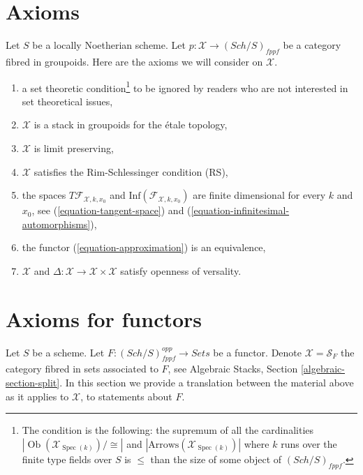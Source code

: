 \documentclass{stacks-project}
\theoremstyle{plain}
\theoremstyle{definition}
\theoremstyle{remark}
\numberwithin{equation}{subsection}
\def\Spec{\mathop{\mathrm{Spec}}}
\def\Sch{\mathit{Sch}}
\def\Ob{\mathop{\mathrm{Ob}}\nolimits}
\begin{document}
\section{Axioms}
\label{section-axioms}

\noindent
Let $S$ be a locally Noetherian scheme. Let
$p : \mathcal{X} \to (\Sch/S)_{fppf}$ be a category fibred in groupoids.
Here are the axioms we will consider on $\mathcal{X}$.
\begin{enumerate}
\item[{[-1]}] a set theoretic condition\footnote{The condition is the
following: the supremum of all the cardinalities
$|\Ob(\mathcal{X}_{\Spec(k)})/\cong|$ and
$|\text{Arrows}(\mathcal{X}_{\Spec(k)})|$ where $k$ runs over the finite
type fields over $S$ is $\leq$ than the size of some
object of $(\Sch/S)_{fppf}$.} to be ignored by
readers who are not interested in set theoretical issues,
\item[{[0]}] $\mathcal{X}$ is a stack in groupoids for the \'etale topology,
\item[{[1]}] $\mathcal{X}$ is limit preserving,
\item[{[2]}] $\mathcal{X}$ satisfies the Rim-Schlessinger condition (RS),
\item[{[3]}] the spaces $T\mathcal{F}_{\mathcal{X}, k, x_0}$ and
$\text{Inf}(\mathcal{F}_{\mathcal{X}, k, x_0})$
are finite dimensional
for every $k$ and $x_0$, see
(\ref{equation-tangent-space}) and
(\ref{equation-infinitesimal-automorphisms}),
\item[{[4]}] the functor (\ref{equation-approximation}) is an equivalence,
\item[{[5]}] $\mathcal{X}$ and
$\Delta : \mathcal{X} \to \mathcal{X} \times \mathcal{X}$ satisfy
openness of versality.
\end{enumerate}










\section{Axioms for functors}
\label{section-axioms-functors}

\noindent
Let $S$ be a scheme. Let $F : (\Sch/S)_{fppf}^{opp} \to \textit{Sets}$ be a
functor. Denote $\mathcal{X} = \mathcal{S}_F$ the category fibred in sets
associated to $F$, see Algebraic Stacks, Section \ref{algebraic-section-split}.
In this section we provide a translation between the material above
as it applies to $\mathcal{X}$, to statements about $F$.
\end{document}
